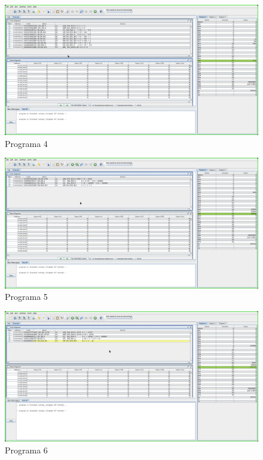 \documentclass[a4paper,11pt]{article}
\begin{document}
\begin{figure}[!ht]
    \caption{Programa 4}
    \centering
    \includegraphics[width=1\textwidth]{programa4}
\end{figure} 
\begin{figure}[!ht]
    \caption{Programa 5}
    \centering
    \includegraphics[width=1\textwidth]{programa5}
\end{figure} 
\begin{figure}[!ht]
    \caption{Programa 6}
    \centering
    \includegraphics[width=1\textwidth]{programa6}
\end{figure} 
\end{document}
